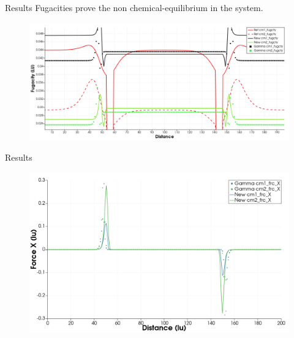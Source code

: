 \documentclass[8pt]{beamer}
\begin{document}
	\begin{frame}{Results}
		Fugacities prove the non chemical-equilibrium in the system.
		\begin{figure}
			\centering
			\includegraphics[width=\textwidth]{pics/1dnewForce/fugacity.png}
		\end{figure}
	\end{frame}

	\begin{frame}{Results}
		\begin{figure}
			\centering
			\includegraphics[width=\textwidth]{pics/1dnewForce/forceX.png}
		\end{figure}
	\end{frame}
	
\end{document}

